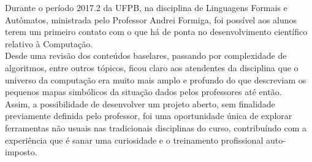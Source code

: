 \documentclass[11pt, a4paper]{article}
\begin{document}
		Durante o período 2017.2 da UFPB, na disciplina de Linguagens Formais e Autômatos, ministrada pelo Professor Andrei Formiga, foi possível aos alunos terem um primeiro contato com o que há de ponta no desenvolvimento científico relativo à Computação.\\

		Desde uma revisão dos conteúdos baselares, passando por complexidade de algoritmos, entre outros tópicos, ficou claro aos atendentes da disciplina que o universo da computação era muito mais amplo e profundo do que descreviam os pequenos mapas simbólicos da situação dados pelos professores até então.\\

		Assim, a possibilidade de desenvolver um projeto aberto, sem finalidade previamente definida pelo professor, foi uma oportunidade única de explorar ferramentas não usuais nas tradicionais disciplinas do curso, contribuíndo com a experiência que é sanar uma curiosidade e o treinamento profissional auto-imposto.
\end{document}
